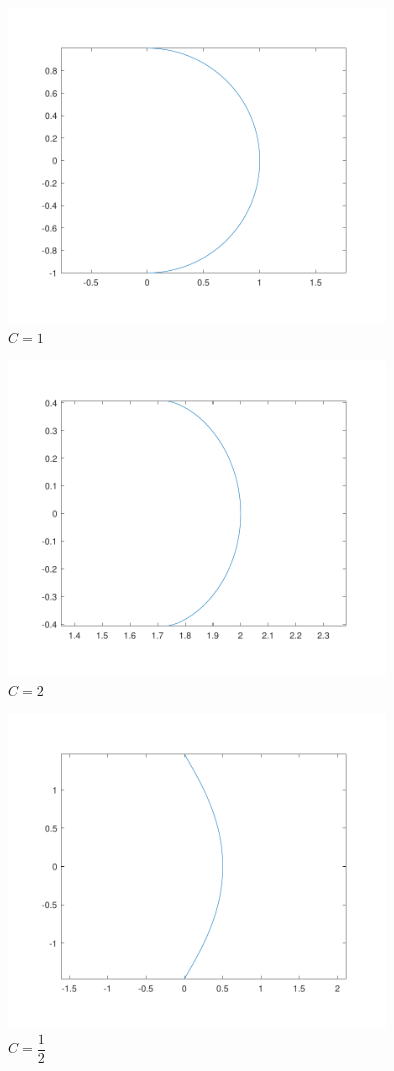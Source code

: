 \documentclass[a4paper]{report}
\begin{document}
\begin{figure}[H]
	\centering	\includegraphics[width=10cm]{7b_1}
	\caption{$C = 1$}
\end{figure}

\begin{figure}[H]
	\centering	\includegraphics[width=10cm]{7b_g1}
	\caption{$C = 2$}
\end{figure}

\begin{figure}[H]
	\centering	\includegraphics[width=10cm]{7b_l1}
	\caption{$C = \dfrac{1}{2}$}
\end{figure}
\end{document}
